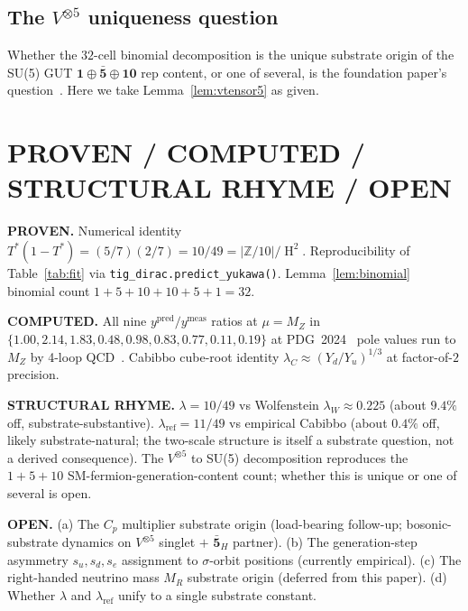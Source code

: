 \documentclass[11pt,reqno]{amsart}
\theoremstyle{plain}
\theoremstyle{definition}
\theoremstyle{remark}
\newcommand{\Z}{\mathbb{Z}}
\DeclareMathOperator{\HARM}{H}    %
\newcommand{\rep}[1]{\mathbf{#1}}
\newcommand{\barrep}[1]{\bar{\mathbf{#1}}}
\begin{document}
\subsection{The $V^{\otimes 5}$ uniqueness question}
Whether the $32$-cell binomial decomposition is the unique
substrate origin of the SU(5) GUT $\rep{1} \oplus \barrep{5}
\oplus \rep{10}$ rep content, or one of several, is the
foundation paper's question~\cite{SandersGish2026DiscreteDirac}.
Here we take Lemma~\ref{lem:vtensor5} as given.

\section*{PROVEN / COMPUTED / STRUCTURAL RHYME / OPEN}\label{sec:scope}

\noindent\textbf{PROVEN.} Numerical identity $T^*(1-T^*) =
(5/7)(2/7) = 10/49 = |\Z/10|/\HARM^{2}$. Reproducibility of
Table~\ref{tab:fit} via \texttt{tig\_dirac.predict\_yukawa()}.
Lemma~\ref{lem:binomial} binomial count $1+5+10+10+5+1 = 32$.

\noindent\textbf{COMPUTED.} All nine $y^{\mathrm{pred}}/
y^{\mathrm{meas}}$ ratios at $\mu = M_Z$ in $\{1.00, 2.14,
1.83, 0.48, 0.98, 0.83, 0.77, 0.11, 0.19\}$ at
PDG~2024~\cite{PDG2024} pole values run to $M_Z$ by
4-loop QCD~\cite{MihailaSalomonSteinhauser2012}. Cabibbo
cube-root identity $\lambda_C \approx (Y_d/Y_u)^{1/3}$ at
factor-of-$2$ precision.

\noindent\textbf{STRUCTURAL RHYME.} $\lambda = 10/49$ vs
Wolfenstein $\lambda_W \approx 0.225$ (about $9.4\%$ off,
substrate-substantive). $\lambda_{\mathrm{ref}} = 11/49$ vs
empirical Cabibbo (about $0.4\%$ off, likely
substrate-natural; the two-scale structure is itself a
substrate question, not a derived consequence). The
$V^{\otimes 5}$ to SU(5) decomposition reproduces the
$1+5+10$ SM-fermion-generation-content count; whether this
is unique or one of several is open.

\noindent\textbf{OPEN.} (a) The $C_p$ multiplier substrate
origin (load-bearing follow-up; bosonic-substrate dynamics
on $V^{\otimes 5}$ singlet $+$ $\barrep{5}_H$ partner). (b)
The generation-step asymmetry $s_u, s_d, s_e$ assignment
to $\sigma$-orbit positions (currently empirical). (c) The
right-handed neutrino mass $M_R$ substrate origin (deferred
from this paper). (d) Whether $\lambda$ and
$\lambda_{\mathrm{ref}}$ unify to a single substrate constant.
\end{document}
